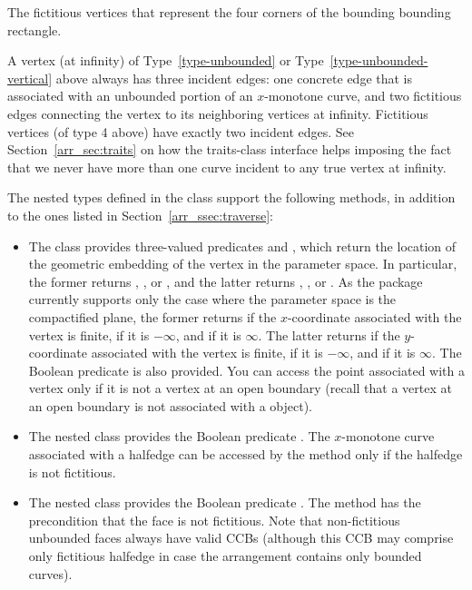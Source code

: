 \begin{ccAdvanced}
\begin{enumerate}
  The fictitious vertices that represent the four corners of the
  bounding bounding rectangle.
\end{enumerate}
A vertex (at infinity) of Type~\ref{type-unbounded} or
Type~\ref{type-unbounded-vertical} above always has
three incident edges: one concrete edge that is associated with an
unbounded portion of an $x$-monotone curve, and two fictitious edges
connecting the vertex to its neighboring vertices at infinity.
Fictitious vertices (of type 4 above) have exactly two incident edges.
See Section~\ref{arr_sec:traits} on how the traits-class interface
helps imposing the fact that we never have more than one curve
incident to any true vertex at infinity.

The nested types defined in the  class support the
following methods, in addition to the ones listed in
Section~\ref{arr_ssec:traverse}:
\begin{itemize}
\item
 The  class provides three-valued predicates
   and , which
  return the location of the geometric embedding of the vertex in the
  parameter space. In particular, the former returns
  , , or
  , and the latter returns
  , , or
  . As the package currently supports only the
  case where the parameter space is the compactified plane, the former
  returns  if the $x$-coordinate associated with the
  vertex is finite,  if it is $-\infty$, and
   if it is $\infty$. The latter returns
   if the $y$-coordinate associated with the vertex
  is finite,  if it is $-\infty$, and
   if it is $\infty$. The Boolean predicate
   is also provided. You can access the
  point associated with a vertex only if it is not a vertex at an open
  boundary (recall that a vertex at an open boundary is not associated
  with a  object).
%
\item
  The nested  class provides the Boolean predicate
  . The $x$-monotone curve associated with
  a halfedge can be accessed by the  method only if the
  halfedge is not fictitious.
%
\item
  The nested  class provides the Boolean predicate
  . The method  has the
  precondition that the face is not fictitious. Note that non-fictitious
  unbounded faces always have valid CCBs (although this CCB may
  comprise only fictitious halfedge in case the arrangement contains
  only bounded curves).
\end{itemize}


\end{ccAdvanced}
